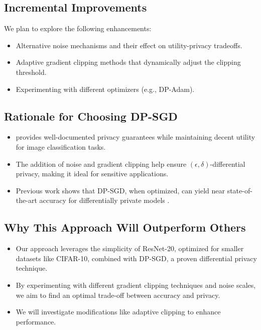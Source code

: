 \documentclass{article}
\begin{document}
    \subsection{Incremental Improvements}\label{subsec:incremental-improvements}
    We plan to explore the following enhancements:
    \begin{itemize}
        \item Alternative noise mechanisms and their effect on utility-privacy tradeoffs.
        \item Adaptive gradient clipping methods that dynamically adjust the clipping threshold.
        \item Experimenting with different optimizers (e.g., DP-Adam).
    \end{itemize}

    \subsection{Rationale for Choosing DP-SGD}\label{subsec:rationale-for-choosing-dp-sgd}
    \begin{itemize}
        \item provides well-documented privacy guarantees \citet{Abadi_2016_DeepLearningDifferentialPrivacy}
        while maintaining decent utility for image classification tasks.
        \item The addition of noise and gradient clipping help ensure $(\epsilon, \delta)$-differential privacy,
        making it ideal for sensitive applications.
        \item Previous work shows that DP-SGD, when optimized, can yield near state-of-the-art accuracy
        for differentially private models \citet{De_2022_ScaleDP_ImageClassification}.
    \end{itemize}

    \subsection{Why This Approach Will Outperform Others}\label{subsec:why-this-approach-will-outperform-others}
    \begin{itemize}
        \item Our approach leverages the simplicity of ResNet-20, optimized for smaller datasets like CIFAR-10,
        combined with DP-SGD, a proven differential privacy technique.
        \item By experimenting with different gradient clipping techniques and noise scales,
        we aim to find an optimal trade-off between accuracy and privacy.
        \item We will investigate modifications like adaptive clipping to enhance performance.
    \end{itemize}
\end{document}
